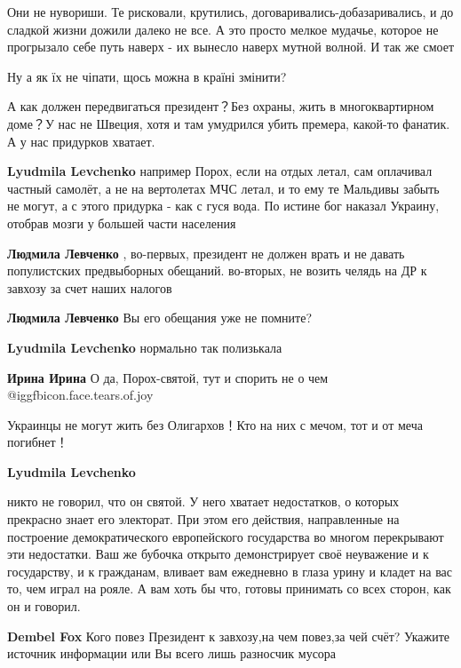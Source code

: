 \begin{itemize}

Они не нувориши. Те рисковали, крутились, договаривались-добазаривались, и до
сладкой жизни дожили далеко не все. А это просто мелкое мудачье, которое не
прогрызало себе путь наверх - их вынесло наверх мутной волной. И так же смоет


Ну а як їх не чіпати, щось можна в країні змінити?


А как должен передвигаться президент？Без охраны, жить в многоквартирном
доме？У нас не Швеция, хотя и там умудрился убить премера, какой-то фанатик. А у
нас придурков хватает.

\begin{itemize} %
\textbf{Lyudmila Levchenko} например Порох, если на отдых летал, сам оплачивал частный самолёт, а не на вертолетах МЧС летал, и то ему те Мальдивы забыть не могут, а с этого придурка - как с гуся вода. По истине бог наказал Украину, отобрав мозги у большей части населения

\textbf{Людмила Левченко} ,
во-первых, президент не должен врать и не давать популистских предвыборных обещаний.
во-вторых, не возить челядь на ДР к завхозу за счет наших налогов

\textbf{Людмила Левченко} Вы его обещания уже не помните?

\textbf{Lyudmila Levchenko} нормально так полизькала

\textbf{Ирина Ирина} О да, Порох-святой, тут и спорить не о чем @igg{fbicon.face.tears.of.joy} 

Украинцы не могут жить без Олигархов！Кто на них с мечом, тот и от меча погибнет！

\textbf{Lyudmila Levchenko} 

никто не говорил, что он святой. У него хватает недостатков, о которых
прекрасно знает его электорат. При этом его действия, направленные на
построение демократического европейского государства во многом перекрывают эти
недостатки. Ваш же бубочка открыто демонстрирует своё неуважение и к
государству, и к гражданам, вливает вам ежедневно в глаза урину и кладет на вас
то, чем играл на рояле. А вам хоть бы что, готовы принимать со всех сторон, как
он и говорил.


\textbf{Dembel Fox} Кого повез Президент к завхозу,на чем повез,за чей счёт? Укажите источник информации или Вы всего лишь разносчик мусора


\end{itemize}
\end{itemize}

